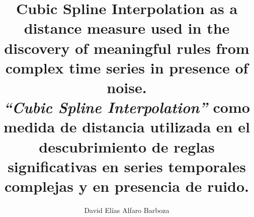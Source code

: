 \title{Cubic Spline Interpolation as a distance measure used in the discovery of meaningful rules from complex time series in presence of noise.\\
\vspace*{10pt}
\vspace*{10pt}
\textit{\enquote{Cubic Spline Interpolation}} como medida de distancia utilizada en el descubrimiento de reglas significativas en series temporales complejas y en presencia de ruido.
\vspace*{10pt}}
\author{David El\'ias Alfaro Barboza}
\maketitle
\begin{abstractpage}

\end{abstractpage}
